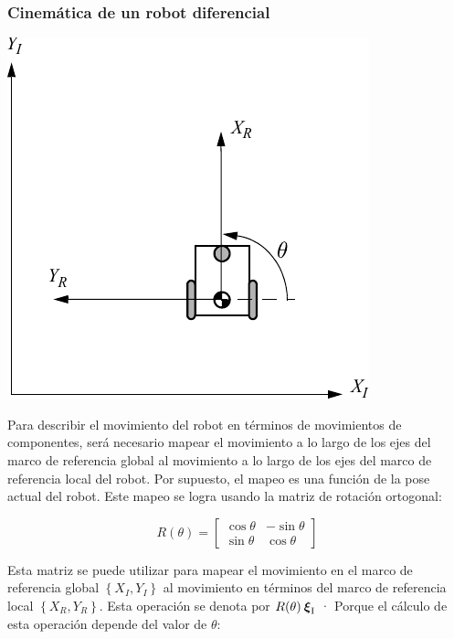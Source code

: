 \begin{frame}
    \frametitle{Cinemática de un robot diferencial}
    \small
    \begin{center}
        \includegraphics[width=0.2\columnwidth]{./images/coordinate_frame_rotation.pdf}
    \end{center}

    Para describir el movimiento del robot en términos de movimientos de componentes, será necesario mapear el movimiento a lo largo de los ejes del marco de referencia global al movimiento a lo largo de los ejes del marco de referencia local del robot. Por supuesto, el mapeo es una función de la pose actual del robot. Este mapeo se logra usando la matriz de rotación ortogonal:

    \begin{equation*}
        R(\theta) =
        \begin{bmatrix}
            \cos \theta & -\sin \theta \\
            \sin \theta & \cos \theta
        \end{bmatrix}
    \end{equation*}

    Esta matriz se puede utilizar para mapear el movimiento en el marco de referencia global $\left\lbrace X_I,Y_I \right\rbrace$ al movimiento en términos del marco de referencia local $\left\lbrace X_R,Y_R \right\rbrace$. Esta operación se denota por $R(\theta)\prescript{\mathrm{}}{}{{\boldsymbol{\mathbf{\xi}}}_\mathrm{I}}$ · Porque el cálculo de esta operación depende del valor de $\theta$:
\end{frame}


